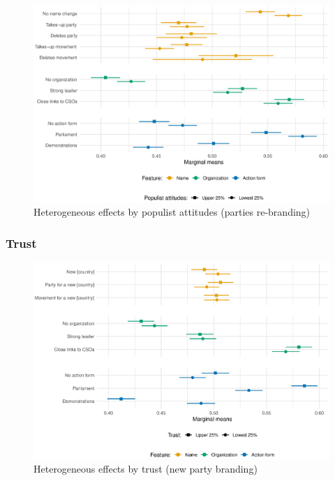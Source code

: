 \documentclass[12pt]{article}
\begin{document}
\begin{figure}[H]
\includegraphics[width=\textwidth]{./Figures/CJ2_heteff_populism_cat_tradeoff.eps}
\caption{Heterogeneous effects by populist attitudes (parties re-branding)}
\end{figure}

\subsubsection{Trust}

\begin{figure}[H]
\includegraphics[width=\textwidth]{./Figures/CJ1_heteff_trust_cat_tradeoff.eps}
\caption{Heterogeneous effects by trust (new party branding)}
\end{figure}
\end{document}
